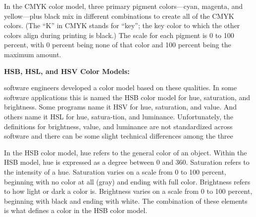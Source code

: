 \documentclass{report}
\begin{document}
         \bigbreak \noindent
         In the CMYK color model, three primary pigment colors—cyan, magenta, and yellow—plus black mix in different combinations to create all of the CMYK colors. (The “K” in CMYK stands for “key”; the key color to which the other colors align during printing is black.) The scale for each pigment is 0 to 100 percent, with 0 percent being none of that color and 100 percent being the maximum amount. 

         \bigbreak \noindent \bigbreak
         \begin{large}
             \noindent \textbf{HSB, HSL, and HSV Color Models:}
         \end{large}

         \bigbreak \noindent
         software engineers developed a color model based on these qualities. In some software applications this is named the HSB color model for hue, saturation, and brightness. Some programs name it HSV for hue, saturation, and value. And others name it HSL for hue, satura-tion, and luminance. Unfortunately, the definitions for brightness, value, and luminance are not standardized across software and there can be some slight technical differences among the three

         \bigbreak \noindent
         In the HSB color model, hue refers to the general color of an object. Within the HSB model, hue is expressed as a degree between 0 and 360. Saturation refers to the intensity of a hue. Saturation varies on a scale from 0 to 100 percent, beginning with no color at all (gray) and ending with full color. Brightness refers to how light or dark a color is. Brightness varies on a scale from 0 to 100 percent, beginning with black and ending with white. The combination of these elements is what defines a color in the HSB color model.
         
\end{document}
